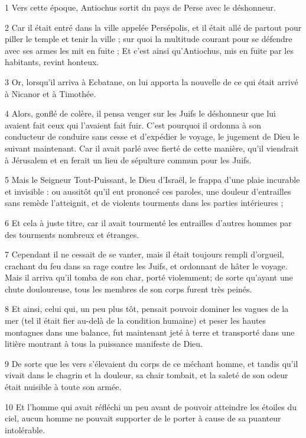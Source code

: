 \par 1 Vers cette époque, Antiochus sortit du pays de Perse avec le déshonneur.
\par 2 Car il était entré dans la ville appelée Persépolis, et il était allé de partout pour piller le temple et tenir la ville ; sur quoi la multitude courant pour se défendre avec ses armes les mit en fuite ; Et c'est ainsi qu'Antiochus, mis en fuite par les habitants, revint honteux.
\par 3 Or, lorsqu'il arriva à Ecbatane, on lui apporta la nouvelle de ce qui était arrivé à Nicanor et à Timothée.
\par 4 Alors, gonflé de colère, il pensa venger sur les Juifs le déshonneur que lui avaient fait ceux qui l'avaient fait fuir. C'est pourquoi il ordonna à son conducteur de conduire sans cesse et d'expédier le voyage, le jugement de Dieu le suivant maintenant. Car il avait parlé avec fierté de cette manière, qu'il viendrait à Jérusalem et en ferait un lieu de sépulture commun pour les Juifs.
\par 5 Mais le Seigneur Tout-Puissant, le Dieu d'Israël, le frappa d'une plaie incurable et invisible : ou aussitôt qu'il eut prononcé ces paroles, une douleur d'entrailles sans remède l'atteignit, et de violents tourments dans les parties intérieures ;
\par 6 Et cela à juste titre, car il avait tourmenté les entrailles d'autres hommes par des tourments nombreux et étranges.
\par 7 Cependant il ne cessait de se vanter, mais il était toujours rempli d'orgueil, crachant du feu dans sa rage contre les Juifs, et ordonnant de hâter le voyage. Mais il arriva qu'il tomba de son char, porté violemment; de sorte qu'ayant une chute douloureuse, tous les membres de son corps furent très peinés.
\par 8 Et ainsi, celui qui, un peu plus tôt, pensait pouvoir dominer les vagues de la mer (tel il était fier au-delà de la condition humaine) et peser les hautes montagnes dans une balance, fut maintenant jeté à terre et transporté dans une litière montrant à tous la puissance manifeste de Dieu.
\par 9 De sorte que les vers s'élevaient du corps de ce méchant homme, et tandis qu'il vivait dans le chagrin et la douleur, sa chair tombait, et la saleté de son odeur était nuisible à toute son armée.
\par 10 Et l'homme qui avait réfléchi un peu avant de pouvoir atteindre les étoiles du ciel, aucun homme ne pouvait supporter de le porter à cause de sa puanteur intolérable.
